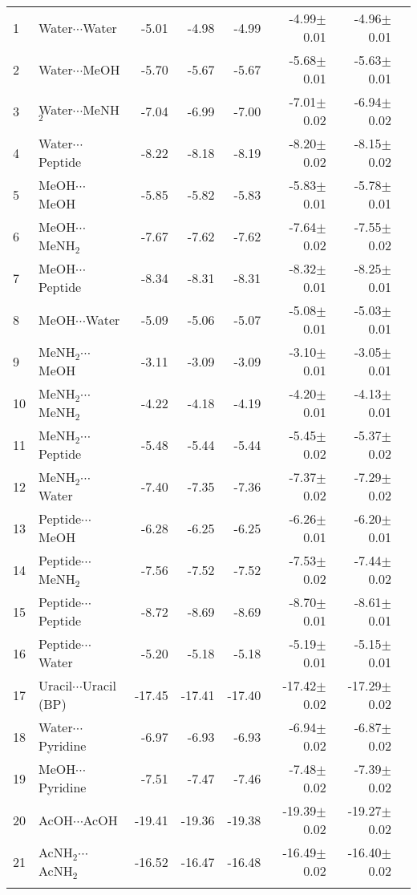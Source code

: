 \begin{longtable}{llrrrrrr}
1 & Water$\cdots$Water & -5.01 & -4.98 & -4.99 & -4.99$\pm$0.01 & -4.96$\pm$0.01 \\
2 & Water$\cdots$MeOH & -5.70 & -5.67 & -5.67 & -5.68$\pm$0.01 & -5.63$\pm$0.01 \\
3 & Water$\cdots$MeNH$_2$ & -7.04 & -6.99 & -7.00 & -7.01$\pm$0.02 & -6.94$\pm$0.02 \\
4 & Water$\cdots$Peptide & -8.22 & -8.18 & -8.19 & -8.20$\pm$0.02 & -8.15$\pm$0.02 \\
5 & MeOH$\cdots$MeOH & -5.85 & -5.82 & -5.83 & -5.83$\pm$0.01 & -5.78$\pm$0.01 \\
6 & MeOH$\cdots$MeNH$_2$ & -7.67 & -7.62 & -7.62 & -7.64$\pm$0.02 & -7.55$\pm$0.02 \\
7 & MeOH$\cdots$Peptide & -8.34 & -8.31 & -8.31 & -8.32$\pm$0.01 & -8.25$\pm$0.01 \\
8 & MeOH$\cdots$Water & -5.09 & -5.06 & -5.07 & -5.08$\pm$0.01 & -5.03$\pm$0.01 \\
9 & MeNH$_2$$\cdots$MeOH & -3.11 & -3.09 & -3.09 & -3.10$\pm$0.01 & -3.05$\pm$0.01 \\
10 & MeNH$_2$$\cdots$MeNH$_2$ & -4.22 & -4.18 & -4.19 & -4.20$\pm$0.01 & -4.13$\pm$0.01 \\
11 & MeNH$_2$$\cdots$Peptide & -5.48 & -5.44 & -5.44 & -5.45$\pm$0.02 & -5.37$\pm$0.02 \\
12 & MeNH$_2$$\cdots$Water & -7.40 & -7.35 & -7.36 & -7.37$\pm$0.02 & -7.29$\pm$0.02 \\
13 & Peptide$\cdots$MeOH & -6.28 & -6.25 & -6.25 & -6.26$\pm$0.01 & -6.20$\pm$0.01 \\
14 & Peptide$\cdots$MeNH$_2$ & -7.56 & -7.52 & -7.52 & -7.53$\pm$0.02 & -7.44$\pm$0.02 \\
15 & Peptide$\cdots$Peptide & -8.72 & -8.69 & -8.69 & -8.70$\pm$0.01 & -8.61$\pm$0.01 \\
16 & Peptide$\cdots$Water & -5.20 & -5.18 & -5.18 & -5.19$\pm$0.01 & -5.15$\pm$0.01 \\
17 & Uracil$\cdots$Uracil (BP) & -17.45 & -17.41 & -17.40 & -17.42$\pm$0.02 & -17.29$\pm$0.02 \\
18 & Water$\cdots$Pyridine & -6.97 & -6.93 & -6.93 & -6.94$\pm$0.02 & -6.87$\pm$0.02 \\
19 & MeOH$\cdots$Pyridine & -7.51 & -7.47 & -7.46 & -7.48$\pm$0.02 & -7.39$\pm$0.02 \\
20 & AcOH$\cdots$AcOH & -19.41 & -19.36 & -19.38 & -19.39$\pm$0.02 & -19.27$\pm$0.02 \\
21 & AcNH$_2$$\cdots$AcNH$_2$ & -16.52 & -16.47 & -16.48 & -16.49$\pm$0.02 & -16.40$\pm$0.02 \\
$$
\end{longtable}
